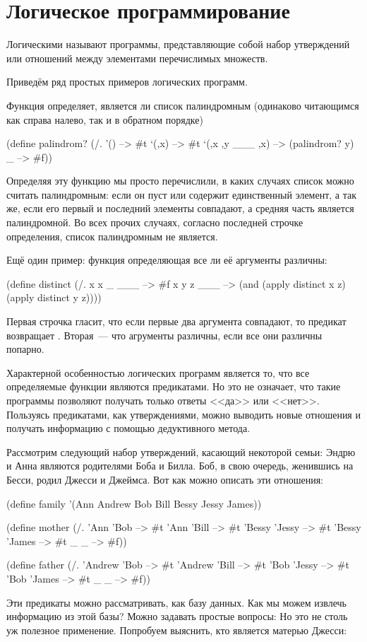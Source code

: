 \section{Логическое программирование}%
Логическими называют программы, представляющие собой набор утверждений или отношений между элементами перечислимых множеств. 

Приведём ряд простых примеров логических программ.

Функция  определяет, является ли список палиндромным (одинаково читающимся как справа налево, так и в обратном порядке)

\begin{SchemeCode}[emph={x,y}]
(define palindrom?
  (/. '() --> #t
      `(,x) --> #t
      `(,x ,y ___ ,x) --> (palindrom? y)
      _ --> #f))
\end{SchemeCode}

Определяя эту функцию мы просто перечислили, в каких случаях список можно считать палиндромным: если он пуст или содержит единственный элемент, а так же, если его первый и последний элементы совпадают, а средняя часть является палиндромной. Во всех прочих случаях, согласно последней строчке определения, список палиндромным не является.

Ещё один пример: функция  определяющая все ли её аргументы различны:

\begin{SchemeCode}
(define distinct
  (/. x x _ ___ --> #f
      x y z ___ --> (and (apply distinct x z)
                         (apply distinct y z))))
\end{SchemeCode}

Первая строчка гласит, что если первые два аргумента совпадают, то предикат возвращает . Вторая~--- что агрументы различны, если все они различны попарно.

Характерной особенностью логических программ является то, что все определяемые функции являются предикатами. Но это не означает, что такие программы позволяют получать только ответы <<да>> или <<нет>>. Пользуясь предикатами, как утверждениями, можно выводить новые отношения и получать информацию с помощью дедуктивного метода.

Рассмотрим следующий набор утверждений, касающий некоторой семьи:
Эндрю и Анна являются родителями Боба и Билла. Боб, в свою очередь, женившись на Бесси, родил Джесси и Джеймса. Вот как можно описать эти отношения:

\begin{Definition}
(define family '(Ann Andrew Bob Bill Bessy Jessy James))

(define mother
  (/. 'Ann 'Bob --> #t
      'Ann 'Bill --> #t
      'Bessy 'Jessy --> #t
      'Bessy 'James --> #t
      _ _ --> #f))

(define father
  (/. 'Andrew 'Bob --> #t
      'Andrew 'Bill --> #t
      'Bob 'Jessy --> #t
      'Bob 'James --> #t
      _ _ --> #f))
\end{Definition}
Эти предикаты можно рассматривать, как базу данных. Как мы можем извлечь информацию из этой базы? Можно задавать простые вопросы:
Но это не столь уж полезное применение. Попробуем выяснить, кто является матерью Джесси:


